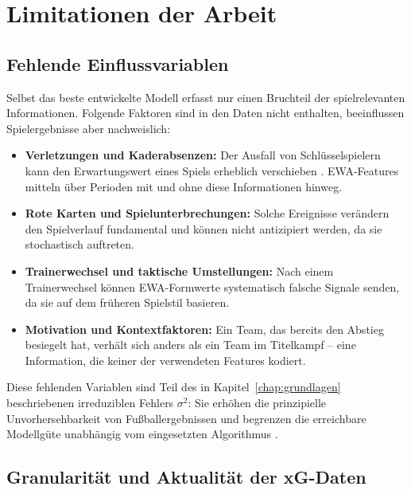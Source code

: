 \section{Limitationen der Arbeit}
\label{sec:disk-limitationen}

\subsection{Fehlende Einflussvariablen}

Selbst das beste entwickelte Modell erfasst nur einen Bruchteil der
spielrelevanten Informationen. Folgende Faktoren sind in den Daten
nicht enthalten, beeinflussen Spielergebnisse aber nachweislich:

\begin{itemize}
    \item \textbf{Verletzungen und Kaderabsenzen:} Der Ausfall von
          Schlüsselspielern kann den Erwartungswert eines Spiels erheblich
          verschieben \cite{DobsonGoddard2011}. EWA-Features mitteln
          über Perioden mit und ohne diese Informationen hinweg.
    \item \textbf{Rote Karten und Spielunterbrechungen:} Solche Ereignisse
          verändern den Spielverlauf fundamental und können nicht antizipiert
          werden, da sie stochastisch auftreten.
    \item \textbf{Trainerwechsel und taktische Umstellungen:} Nach einem
          Trainerwechsel können EWA-Formwerte systematisch falsche Signale
          senden, da sie auf dem früheren Spielstil basieren.
    \item \textbf{Motivation und Kontextfaktoren:} Ein Team, das bereits
          den Abstieg besiegelt hat, verhält sich anders als ein Team im
          Titelkampf -- eine Information, die keiner der verwendeten
          Features kodiert.
\end{itemize}

Diese fehlenden Variablen sind Teil des in Kapitel~\ref{chap:grundlagen}
beschriebenen irreduziblen Fehlers $\sigma^2$: Sie erhöhen die prinzipielle
Unvorhersehbarkeit von Fußballergebnissen und begrenzen die erreichbare
Modellgüte unabhängig vom eingesetzten Algorithmus \cite{GemanEtAl1992}.

\subsection{Granularität und Aktualität der xG-Daten}


